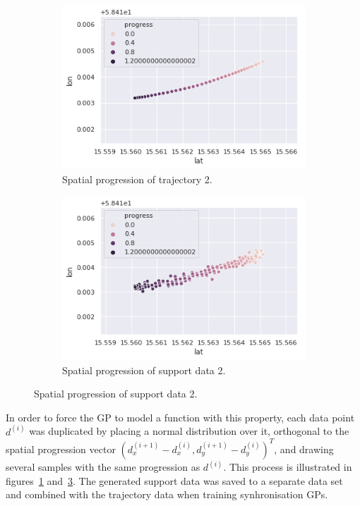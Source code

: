 \begin{figure}[H]
	\caption{Spacial progression}
  \begin{subfigure}[b]{0.5\textwidth}
    \includegraphics[width=\textwidth]{figures/traj-without-support-data.png}
    \caption{Spatial progression of trajectory 2.}
    \label{fig:traj-without-support-data}
  \end{subfigure}
  \begin{subfigure}[b]{0.5\textwidth}
    \includegraphics[width=\textwidth]{figures/traj-with-support-data.png}
    \caption{Spatial progression of support data 2.}
    \label{fig:traj-with-support-data}
  \end{subfigure}
\end{figure}
\noindent
In order to force the GP to model a function with this property, each data point $d^{(i)}$ was duplicated by placing a normal distribution over it, orthogonal to the spatial progression vector ${(d^{(i+1)}_x - d^{(i)}_x, d^{(i+1)}_y - d^{(i)}_y)}^T$, and drawing several samples with the same progression as $d^{(i)}$. This process is illustrated in figures~\ref{fig:traj-without-support-data} and~\ref{fig:traj-with-support-data}. The generated support data was saved to a separate data set and combined with the trajectory data when training synhronisation GPs.


